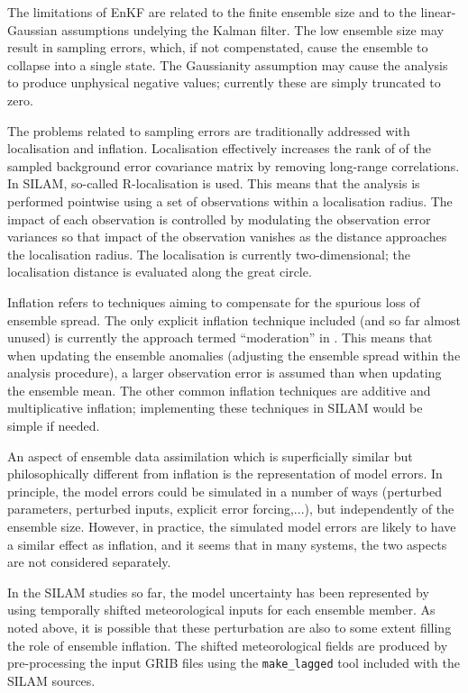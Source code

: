 \documentclass[a4paper]{article}
\begin{document}
The limitations of EnKF are related to the finite ensemble size and to the linear-Gaussian
assumptions undelying the Kalman filter. The low ensemble size may result in sampling errors,
which, if not compenstated, cause the ensemble to collapse into a single state. The
Gaussianity assumption may cause the analysis to produce unphysical negative values;
currently these are simply truncated to zero.

The problems related to sampling errors are traditionally addressed with localisation and
inflation. Localisation effectively increases the rank of of the sampled background error
covariance matrix by removing long-range correlations. In SILAM, so-called R-localisation
is used. This means that the analysis is performed pointwise using a set of observations
within a localisation radius. The impact of each observation is controlled by modulating
the observation error variances so that impact of the observation vanishes as the distance
approaches the localisation radius. The localisation is currently two-dimensional; the
localisation distance is evaluated along the great circle.

Inflation refers to techniques aiming to compensate for the spurious loss of ensemble
spread. The only explicit inflation technique included (and so far almost unused) is
currently the approach termed ``moderation'' in \citet{Sakov2012}. This means that when
updating the ensemble anomalies (adjusting the ensemble spread within the analysis
procedure), a larger observation error is assumed than when updating the ensemble
mean. The other common inflation techniques are additive and multiplicative inflation;
implementing these techniques in SILAM would be simple if needed.

An aspect of ensemble data assimilation which is superficially similar but philosophically
different from inflation is the representation of model errors. In principle, the model
errors could be simulated in a number of ways (perturbed parameters, perturbed inputs,
explicit error forcing,...), but independently of the ensemble size. However, in practice,
the simulated model errors are likely to have a similar effect as inflation, and it seems
that in many systems, the two aspects are not considered separately.

In the SILAM studies so far, the model uncertainty has been represented by using
temporally shifted meteorological inputs for each ensemble member. As noted above, it is
possible that these perturbation are also to some extent filling the role of ensemble
inflation. The shifted meteorological fields are produced by pre-processing the input GRIB
files using the \verb|make_lagged| tool included with the SILAM sources.
 
\end{document}
